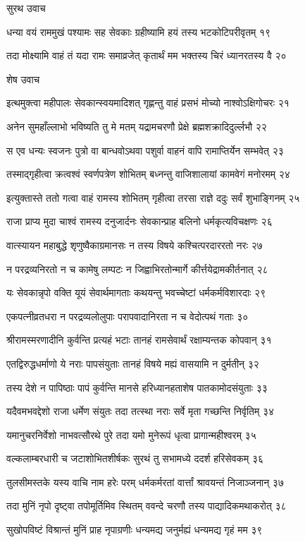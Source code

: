 सुरथ उवाच

धन्या वयं राममुखं पश्यामः सह सेवकाः
ग्रहीष्यामि हयं तस्य भटकोटिपरीवृतम् १९

तदा मोक्ष्यामि वाहं तं यदा रामः समाव्रजेत्
कृतार्थं मम भक्तस्य चिरं ध्यानरतस्य वै २०

शेष उवाच

इत्थमुक्त्वा महीपालः सेवकान्स्वयमादिशत्
गृह्णन्तु वाहं प्रसभं मोच्यो नाश्वोऽक्षिगोचरः २१

अनेन सुमहाँल्लाभो भविष्यति तु मे मतम्
यद्रामचरणौ प्रेक्षे ब्रह्मशक्रादिदुर्ल्लभौ २२

स एव धन्यः स्वजनः पुत्रो वा बान्धवोऽथवा
पशुर्वा वाहनं वापि रामाप्तिर्येन सम्भवेत् २३

तस्माद्गृहीत्वा क्रत्वश्वं स्वर्णपत्रेण शोभितम्
बध्नन्तु वाजिशालायां कामवेगं मनोरमम् २४

इत्युक्तास्ते ततो गत्वा वाहं रामस्य शोभितम्
गृहीत्वा तरसा राज्ञे ददुः सर्वं शुभाङ्गिनम् २५

राजा प्राप्य मुदा चाश्वं रामस्य दनुजार्दनः
सेवकान्प्राह बलिनो धर्मकृत्यविचक्षणः २६

वात्स्यायन महाबुद्धे शृणुष्वैकाग्रमानसः
न तस्य विषये कश्चित्परदाररतो नरः २७

न परद्रव्यनिरतो न च कामेषु लम्पटः
न जिह्वाभिरतोन्मार्गे कीर्त्तयेद्रामकीर्तनात् २८

यः सेवकान्नृपो वक्ति यूयं सेवार्थमागताः
कथयन्तु भवच्चेष्टां धर्मकर्मविशारदाः २९

एकपत्नीव्रतधरा न परद्रव्यलोलुपाः
परापवादानिरता न च वेदोत्पथं गताः ३०

श्रीरामस्मरणादीनि कुर्वन्ति प्रत्यहं भटाः
तानहं रामसेवार्थं रक्षाम्यन्तक कोपवान् ३१

एतद्विरुद्धधर्माणो ये नराः पापसंयुताः
तानहं विषये मह्यं वासयामि न दुर्मतीन् ३२

तस्य देशे न पापिष्ठाः पापं कुर्वन्ति मानसे
हरिध्यानहताशेष पातकामोदसंयुताः ३३

यदैवमभवद्देशो राजा धर्मेण संयुतः
तदा तत्स्था नराः सर्वे मृता गच्छन्ति निर्वृतिम् ३४

यमानुचरनिर्वेशो नाभवत्सौरथे पुरे
तदा यमो मुनेरूपं धृत्वा प्रागान्महीश्वरम् ३५

वल्कलाम्बरधारी च जटाशोभितशीर्षकः
सुरथं तु सभामध्ये ददर्श हरिसेवकम् ३६

तुलसीमस्तके यस्य वाचि नाम हरेः परम्
धर्मकर्मरतां वार्त्तां श्रावयन्तं निजाञ्जनान् ३७

तदा मुनिं नृपो दृष्ट्वा तपोमूर्तिमिव स्थितम्
ववन्दे चरणौ तस्य पाद्यादिकमथाकरोत् ३८

सुखोपविष्टं विश्रान्तं मुनिं प्राह नृपाग्रणीः
धन्यमद्य जनुर्मह्यं धन्यमद्य गृहं मम ३९

